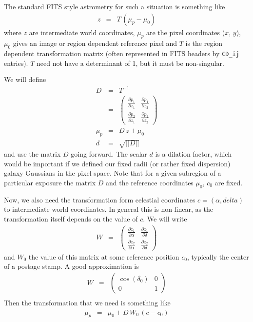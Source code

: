 \documentclass[modern]{aastex6}
\renewcommand{\det}[1]{||{#1}||}
\begin{document}
The standard FITS style astrometry for such a situation \citep{greisen02} is something like
\begin{eqnarray}
z & = & T \, (\mu_p - \mu_0)
\end{eqnarray}
where $z$ are intermediate world coordinates,
$\mu_p$ are the pixel coordinates ($x$, $y$),
$\mu_0$ gives an image or region dependent reference pixel
and $T$ is the region dependent transformation matrix (often represented in FITS headers by \texttt{CD\_ij} entries).
$T$ need not have a determinant of 1, but it must be non-singular. 

We will define
\begin{eqnarray}
D & = & T^{-1} \\
 & = & \begin{pmatrix} \frac{\partial p_1}{\partial z_1} & \frac{\partial p_1}{\partial z_2} \\ \frac{\partial p_2}{\partial z_1} & \frac{\partial p_2}{\partial z_2 }\end{pmatrix} \\
\mu_p & = & D \, z + \mu_0 \nonumber \\
d & = &\sqrt{\det{D}} \nonumber
\end{eqnarray}
and use the matrix $D$ going forward.
The scalar $d$ is a dilation factor, which would be important if we defined our fixed radii (or rather fixed dispersion) galaxy Gaussians  in the pixel space.
Note that for a given subregion of a particular exposure the matrix $D$ and the reference coordinates $\mu_0$, $c_0$ are fixed.

Now, we also need the transformation form celestial coordinates $c = (\alpha, delta)$ to intermediate world coordinates.
In general this is non-linear, as the transformation itself depends on the value of $c$.
We will write
\begin{eqnarray}
W & = & \begin{pmatrix} \frac{\partial z_1}{\partial \alpha} & \frac{\partial z_1}{\partial \delta} \\ \frac{\partial z_2}{\partial \alpha} & \frac{\partial z_2}{\partial \delta }\end{pmatrix}
\end{eqnarray}
and $W_0$ the value of this matrix at some reference position $c_0$, typically the center of a postage stamp.
A good approximation is 
\begin{eqnarray}
W & = & \begin{pmatrix}  \cos(\delta_0) & 0 \\ 0& 1 \end{pmatrix} \\
\end{eqnarray}
Then the transformation that we need is something like
\begin{eqnarray}
\mu_p & = & \mu_0 + D \, W_0 \, (c-c_0) 
\end{eqnarray}
\end{document}
